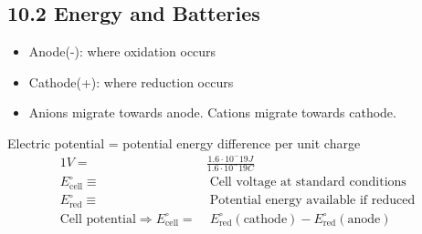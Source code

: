 \subsection{10.2 Energy and Batteries}
    \begin{itemize}
        \item Anode(-): where oxidation occurs
        \item Cathode(+): where reduction occurs
        \item Anions migrate towards anode. Cations migrate towards cathode.
    \end{itemize}

    Electric potential = potential energy difference per unit charge
    \begin{align*}
        1V =& \frac{1.6 \cdot 10^-19 J}{1.6 \cdot 10^-19 C}\\
        E^\circ_\text{cell} \equiv& \; \text{Cell voltage at standard conditions}\\
        E^\circ_\text{red} \equiv& \; \text{Potential energy available if reduced}\\
        \text{Cell potential} \Rightarrow E^\circ_\text{cell} =& \; E^\circ_\text{red}(\text{cathode}) - E^\circ_\text{red}(\text{anode})
    \end{align*}